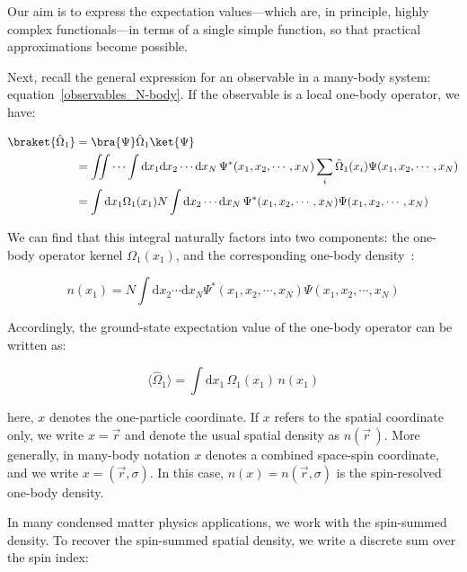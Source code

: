 Our aim is to express the expectation values—which are, in principle, highly complex functionals—in terms of a single simple function, so that practical approximations become possible.

Next, recall the general expression for an observable in a many-body system: equation~\eqref{observables_N-body}. If the observable is a local one-body operator, we have:

\begin{equation}
\begin{aligned}
    \braket{\hat\Omega_1}
    &= \bra{\Psi}\hat\Omega_1\ket{\Psi} \\
    &= \iint\cdots\int \mathrm{d}x_1\mathrm{d}x_2\cdots\mathrm{d}x_N\,\Psi^*(x_1,x_2,\cdots,x_N)\sum_{i}\hat\Omega_1(x_i)\Psi(x_1,x_2,\cdots,x_N) \\
    &= \int\mathrm{d}x_1\Omega_1(x_1)N\int\mathrm{d}x_2\cdots\mathrm{d}x_N\,\Psi^*(x_1,x_2,\cdots,x_N)\Psi(x_1,x_2,\cdots,x_N)
\end{aligned}
\label{observables_one-body}
\end{equation}

We can find that this integral naturally factors into two components: the one-body operator kernel $\Omega_1(x_1)$,
and the corresponding one-body density~\cite{engel2011density,mazziotti2012two}:

\begin{equation}
    n(x_1)=N\int\mathrm{d}x_2\cdots\mathrm{d}x_N\Psi^*(x_1,x_2,\cdots,x_N)\Psi(x_1,x_2,\cdots,x_N)
\label{one-body_density}
\end{equation}

Accordingly, the ground-state expectation value of the one-body operator can be written as:

\begin{equation}
\langle\hat{\Omega}_1\rangle=\int\mathrm{d}x_1\,\Omega_1(x_1)\,n(x_1)
\label{expectation_one_body_operator}
\end{equation}

here, $x$ denotes the one-particle coordinate.
If $x$ refers to the spatial coordinate only, we write $x=\vec{r}$ and denote the usual spatial density as $n(\vec{r}\,)$.
More generally, in many-body notation $x$ denotes a combined space-spin coordinate, and we write $x=(\vec{r},\sigma)$.
In this case, $n(x)=n(\vec{r},\sigma)$ is the spin-resolved one-body density.

In many condensed matter physics applications, we work with the spin-summed density.
To recover the spin-summed spatial density, we write a discrete sum over the spin index:

